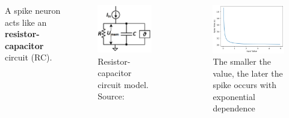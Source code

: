 \begin{frame}[allowframebreaks]
	\begin{columns}
		\par A spike neuron acts like an \textbf{resistor-capacitor} circuit (RC).
		\begin{figure}
			\centering
			\includegraphics[width=0.6\linewidth]{images/rcmodel}
			\caption[RC model]{Resistor-capacitor circuit model. Source: \cite{10242251}}
			\label{fig:rcmodel}
		\end{figure}
		
		\begin{figure}
			\centering
			\includegraphics[width=0.7\linewidth]{images/rcmodelplot}
			\caption{The smaller the value, the later the spike occurs with exponential dependence}
			\label{fig:rcmodelplot}
		\end{figure}
		
	\end{columns}

	
\end{frame}

